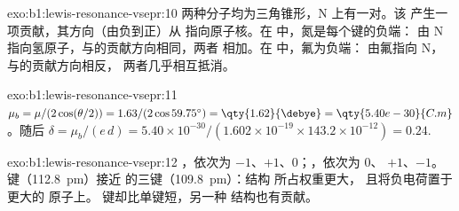 \begin{solution}{exo:b1:lewis-resonance-vsepr:10}
两种分子均为三角锥形，N 上有一对。该
产生一项贡献，其方向（由负到正）从
指向原子核。在  中，氮是每个键的负端：
由 N 指向氢原子，与的贡献方向相同，两者
相加。在  中，氟为负端：
由氟指向 N，与的贡献方向相反，
两者几乎相互抵消。
\end{solution}

\begin{solution}{exo:b1:lewis-resonance-vsepr:11}
$\mu_b = \mu/(2\cos(\theta/2)) = 1.63/(2\cos 59.75^\circ) =
\qty{1.62}{\debye} = \qty{5.40e-30}{C.m}$。随后 $\delta = \mu_b/(e\,d) =
5.40 \times 10^{-30}/(1.602 \times 10^{-19} \times 143.2 \times 10^{-12})
= 0.24$.
\end{solution}

\begin{solution}{exo:b1:lewis-resonance-vsepr:12}
，依次为 $-1$、$+1$、$0$；，依次为 $0$、
$+1$、$-1$。 键（\qty{112.8}{pm}）接近
 的三键（\qty{109.8}{pm}）：结构  所占权重更大，
且将负电荷置于更大的
原子上。 键却比单键短，另一种
结构也有贡献。
\end{solution}

